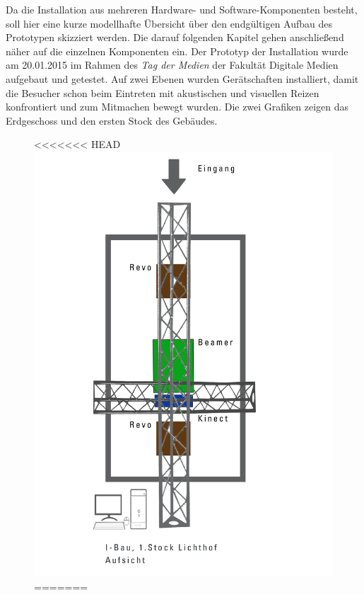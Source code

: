 Da die Installation aus mehreren Hardware- und Software-Komponenten besteht, soll hier eine kurze modellhafte Übersicht über den endgültigen Aufbau des Prototypen skizziert werden. Die darauf folgenden Kapitel gehen anschließend näher auf die einzelnen Komponenten ein. Der Prototyp der Installation wurde am 20.01.2015 im Rahmen des \textit{Tag der Medien} der Fakultät Digitale Medien aufgebaut und getestet. Auf zwei Ebenen wurden Gerätschaften installiert, damit die Besucher schon beim Eintreten mit akustischen und visuellen Reizen konfrontiert und zum Mitmachen bewegt wurden. Die zwei Grafiken zeigen das Erdgeschoss und den ersten Stock des Gebäudes.
\begin{figure}[htbp]
	\centering
<<<<<<< HEAD
		\includegraphics[width=1.0\textwidth]{images/ModelFirstFloor.png}
=======

\end{figure}
